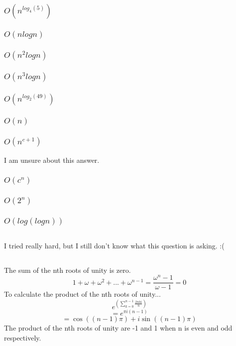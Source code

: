 \documentclass{article}
\begin{document}
\subsubsection{$O(n^{log_4(5)})$}
\subsubsection{$O(nlogn)$}
\subsubsection{$O(n^2logn)$}
\subsubsection{$O(n^3logn)$}
\subsubsection{$O(n^{log_2(49)})$}
\subsubsection{$O(n)$}
\subsubsection{$O(n^{c+1})$} I am unsure about this answer. 
\subsubsection{$O(c^n)$}
\subsubsection{$O(2^n)$}
\subsubsection{$O(log(logn))$}
\subsection{}I tried really hard, but I still don't know what this question is asking. :(
\subsection{}
The sum of the nth roots of unity is zero.
$$1 + \omega + \omega^2 + ... + \omega^{n-1} = \frac{\omega^n-1}{\omega-1} = 0$$
To calculate the product of the nth roots of unity...
$$e^{(\sum_{k=0}^{n-1}\frac{2\pi ki}{n})}$$
$$=e^{\pi i(n-1)}$$
$$=\cos((n-1)\pi)+i\sin((n-1)\pi)$$
The product of the nth roots of unity are -1 and 1 when n is even and odd respectively. 
\end{document}
